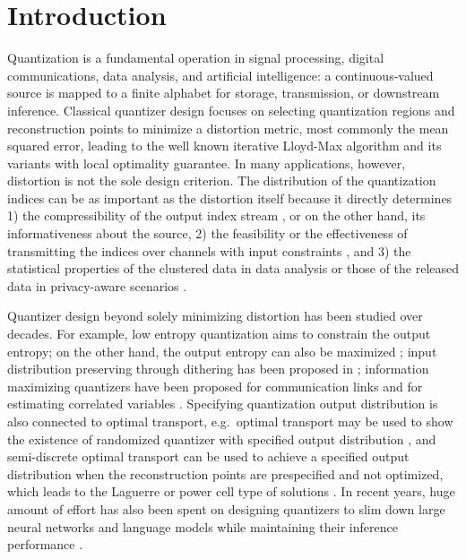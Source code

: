 \documentclass[conference]{IEEEtran}
\begin{document}


\section{Introduction}

Quantization is a fundamental operation in signal processing, digital communications, data analysis, and artificial intelligence: a continuous-valued source is mapped to a finite alphabet for storage, transmission, or downstream inference. Classical quantizer design focuses on selecting quantization regions and reconstruction points to minimize a distortion metric, most commonly the mean squared error, leading to the well known iterative Lloyd-Max algorithm \cite{Lloyd1982, Max1960} and its variants \cite{quant_1998} with local optimality guarantee. In many applications, however, distortion is not the sole design criterion. The distribution of the quantization indices can be as important as the distortion itself because it directly determines 1) the compressibility of the output index stream \cite{Gallager_2008}, or on the other hand, its informativeness about the source, 2) the feasibility or the effectiveness of transmitting the indices over channels with input constraints \cite{MarcusRothSiegel}, and 3) the statistical properties of the clustered data in data analysis or those of the released data in privacy-aware scenarios \cite{REBOLLOMONEDERO2013185, dist_prsv_k_anonym}.

Quantizer design beyond solely minimizing distortion has been studied over decades. For example, low entropy quantization \cite[Chap. 3]{Gallager_2008} aims to constrain the output entropy; on the other hand, the output entropy can also be maximized \cite{quant_max_ent}; input distribution preserving through dithering has been proposed in \cite{dpq2010}; information maximizing quantizers have been proposed for communication links \cite{boa12, Zeitler12} and for estimating correlated variables \cite{info_distill_quantiz}.
Specifying quantization output distribution is also connected to optimal transport, e.g.\ optimal transport may be used to show the existence of randomized quantizer with specified output distribution \cite{random_OT_quant}, and semi-discrete optimal transport can be used to achieve a specified output distribution when the reconstruction points are prespecified and not optimized, which leads to the Laguerre or power cell type of solutions \cite{power_cell_cluster, var_disc_ot}. In recent years, huge amount of effort has also been spent on designing quantizers to slim down large neural networks and language models while maintaining their inference performance \cite{qnn_survey, eval_q_LLM}. 
\end{document}
